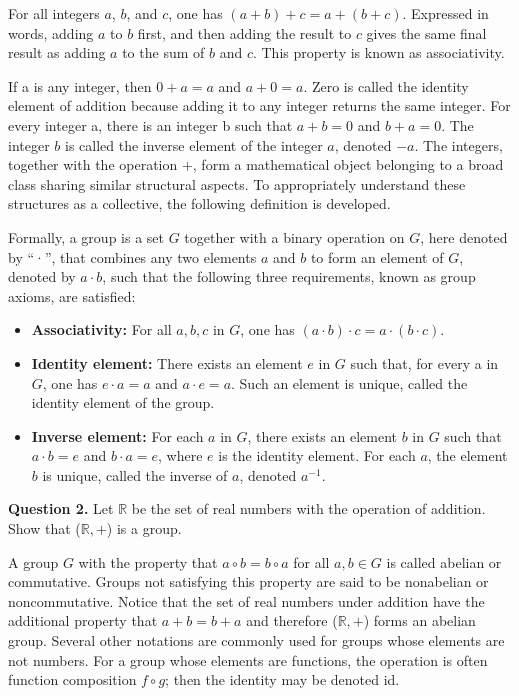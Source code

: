 \documentclass{article}
\begin{document}
For all integers $a$, $b$, and $c$, one has $(a + b) + c = a + (b + c)$. Expressed in words, adding $a$ to $b$ first, and then adding the result to $c$ gives the same final result as adding $a$ to the sum of $b$ and $c$. This property is known as associativity.

If a is any integer, then $0 + a = a$ and $a + 0 = a$. Zero is called the identity element of addition because adding it to any integer returns the same integer. For every integer a, there is an integer b such that $a + b = 0$ and $b + a = 0$. The integer $b$ is called the inverse element of the integer $a$, denoted $-a$. The integers, together with the operation +, form a mathematical object belonging to a broad class sharing similar structural aspects. To appropriately understand these structures as a collective, the following definition is developed.

Formally, a group is a set $G$ together with a binary operation on $G$, here denoted by “·”, that combines any two elements $a$ and $b$ to form an element of $G$, denoted by $a · b$, such that the following three requirements, known as group axioms, are satisfied:

\begin{itemize}
  \item \textbf{Associativity:} For all $a, b, c$ in $G$, one has $(a · b) · c = a · (b · c)$.
  \item \textbf{Identity element:} There exists an element $e$ in $G$ such that, for every a in $G$, one has $e · a = a$ and $a · e = a$. Such an element is unique, called the identity element of the group.
  \item \textbf{Inverse element:} For each $a$ in $G$, there exists an element $b$ in $G$ such that $a · b = e$ and $b · a = e$, where $e$ is the identity element. For each $a$, the element $b$ is unique, called the inverse of $a$, denoted $a^{-1}$.
\end{itemize}

\begin{tcolorbox}
  \textbf{Question 2.} Let $\mathbb{R}$ be the set of real numbers with the operation of addition. Show that ($\mathbb{R}, +$) is a group.
\end{tcolorbox}

A group $G$ with the property that $a \circ  b = b \circ  a$ for all $a, b \in G$ is called abelian or commutative. Groups not satisfying this property are said to be nonabelian or noncommutative. Notice that the set of real numbers 
under addition have the additional property that $a + b = b + a$ and therefore ($\mathbb{R}, +$) forms an abelian group. Several other notations are commonly used for groups whose elements are not numbers. For a group whose elements are functions, the operation is often function composition $f \circ g$; then the identity may be denoted id.
\end{document}
